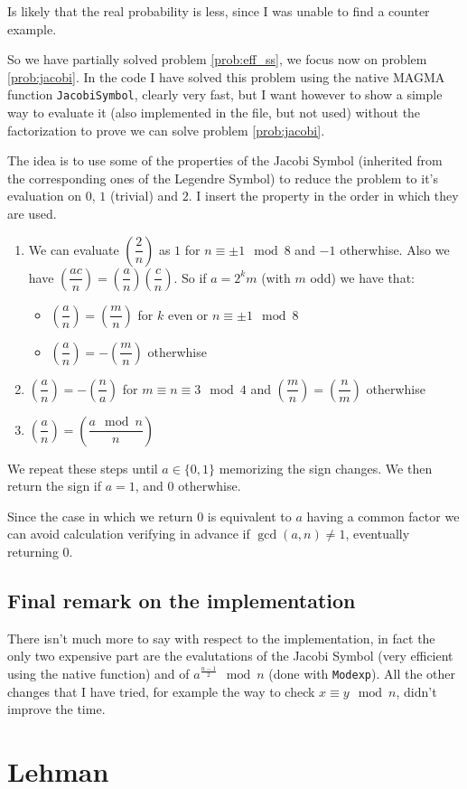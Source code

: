 \documentclass{article}
\theoremstyle{plain}
\theoremstyle{remark}
\theoremstyle{definition}
\begin{document}
Is likely that the real probability is less, since I was unable to find a counter example.

So we have partially solved problem \ref{prob:eff_ss}, we focus now on problem \ref{prob:jacobi}. In the code I have solved this problem using the native MAGMA function \texttt{JacobiSymbol}, clearly very fast, but I want however to show a simple way to evaluate it (also implemented in the file, but not used) without the factorization to prove we can solve problem \ref{prob:jacobi}.

The idea is to use some of the properties of the Jacobi Symbol (inherited from the corresponding ones of the Legendre Symbol) to reduce the problem to it's evaluation on $0$, $1$ (trivial) and $2$. I insert the property in the order in which they are used. 
\begin{enumerate}
	\item We can evaluate $ \left(\dfrac{2}{n}\right) $ as $1$ for $n\equiv \pm 1 \mod 8$ and $-1$ otherwhise. Also we have $ \left(\dfrac{ac}{n}\right) = \left(\dfrac{a}{n}\right)  \left(\dfrac{c}{n}\right) $. So if $a = 2^km$ (with $m$ odd) we have that:
	\begin{itemize}
		\item $\left(\dfrac{a}{n}\right) = \left(\dfrac{m}{n}\right)$ for $k$ even or $n\equiv \pm 1 \mod 8$ 
		\item $\left(\dfrac{a}{n}\right) = -\left(\dfrac{m}{n}\right)$ otherwhise
	\end{itemize}
	\item $\left(\dfrac{a}{n}\right) = - \left(\dfrac{n}{a}\right)$ for $m \equiv n \equiv 3 \mod 4$ and $\left(\dfrac{m}{n}\right) = \left(\dfrac{n}{m}\right)$ otherwhise
	\item $\left(\dfrac{a}{n}\right) = \left(\dfrac{a \mod n}{n}\right)$
\end{enumerate}

We repeat these steps until $a\in\{0,1\}$ memorizing the sign changes. We then return the sign if $a=1$, and $0$ otherwhise.

Since the case in which we return $0$ is equivalent to $a$ having a common factor we can avoid calculation verifying in advance if $\gcd(a,n) \neq 1$, eventually returning $0$. 

\subsection{Final remark on the implementation}

There isn't much more to say with respect to the implementation, in fact the only two expensive part are the evalutations of the Jacobi Symbol (very efficient using the native function) and of $a^{\frac{n-1}{2}} \mod n$ (done with \texttt{Modexp}). All the other changes that I have tried, for example the way to check $x\equiv y \mod n$, didn't improve the time.  



\section{Lehman}

\appendix


\newpage
\printbibliography
\end{document}
